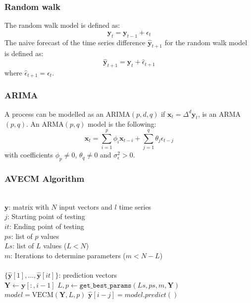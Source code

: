 \documentclass{beamer}
\begin{document}
\begin{frame}
\begin{columns}
\begin{column}{.45\linewidth}
\begin{figure}
\end{figure}
\end{column}
\end{columns}
\end{frame}

\begin{frame}
\frametitle{Random walk}
The random walk model is defined as:
\begin{equation}
\mathbf{y}_t = \mathbf{y}_{t-1} + \epsilon_{t}
\label{rwmodel}
\end{equation}
The naive forecast of the time series difference $\hat{\mathbf{y}}_{t+1}$ for the random walk model is defined as:
\begin{equation}
\hat{\mathbf{y}}_{t+1} = \mathbf{y}_t + \hat{\epsilon}_{t+1} 
\end{equation}
\noindent where  $\hat{\epsilon}_{t+1} = \epsilon_{t}$.
\end{frame}
%
%
\begin{frame}
\frametitle{ARIMA}
A process can be modelled as an ARIMA$(p,d,q)$ if $\mathbf{x}_t = \Delta^d \mathbf{y}_t $, is an ARMA$(p,q)$. An ARMA$(p,q)$ model is the following:
\begin{equation}
\mathbf{x}_t = \sum_{i=1}^p \phi_i \mathbf{x}_{t-i}  +  \sum_{j=1}^q \theta_j \epsilon_{t-j}  
\end{equation}
\noindent with coefficients $\phi_p \neq 0$, $\theta_q \neq 0$ and $\sigma_{\epsilon}^2 > 0$.
\end{frame}



\begin{frame}
\frametitle{AVECM Algorithm}
\small
\begin{algorithmic}[1]
\REQUIRE $\,$ \\
$\mathbf{y}$: matrix with $N$ input vectors and $l$ time series\\
$j$: Starting point of testing \\
$it$: Ending point of testing \\
$ps$: list of $p$ values \\
$Ls$: list of $L$ values ($L<N$) \\
$m$: Iterations to determine parameters ($m < N-L$)\\
\ENSURE  $\,$ \\
$\{ \hat{\mathbf{y}}[1],\dots,\hat{\mathbf{y}}[it]\}$: prediction vectors \\
   \STATE $\mathbf{Y} \gets \mathbf{y}[:,i-1]$
    \STATE $L,p \gets
    \texttt{get\_best\_params}(Ls,ps,m,\mathbf{Y})$
        \STATE $model = \text{VECM}(\mathbf{Y},L, p)$
        \STATE $\hat{\mathbf{y}}[i-j] = model.predict()$
\ENDFOR
\end{algorithmic}
\end{frame}

\end{document}
